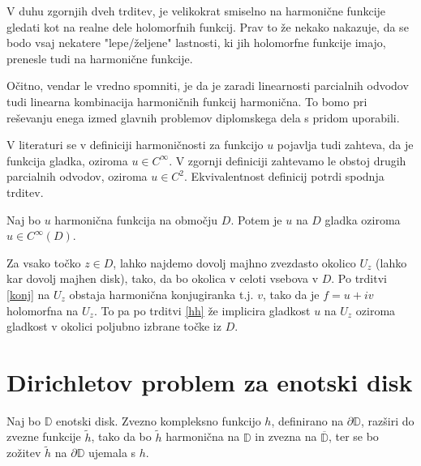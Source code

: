 \documentclass[mat1]{fmfdelo}
\begin{document}
    \begin{opomba}
        V duhu zgornjih dveh trditev, je velikokrat smiselno na harmonične funkcije gledati kot na realne dele holomorfnih funkcij. Prav to že nekako nakazuje, da se bodo vsaj nekatere "lepe/željene" lastnosti, ki jih holomorfne funkcije imajo, prenesle tudi na harmonične funkcije.
    \end{opomba}
    \begin{opomba}
        \label{lin}
        Očitno, vendar le vredno spomniti, je da je zaradi linearnosti parcialnih odvodov tudi linearna kombinacija harmoničnih funkcij harmonična. To bomo pri reševanju enega izmed glavnih problemov diplomskega dela s pridom uporabili.
    \end{opomba}
    \begin{opomba}
        V literaturi se v definiciji harmoničnosti za funkcijo $u$ pojavlja tudi zahteva, da je funkcija gladka, oziroma $u \in C^{\infty}$. V zgornji definiciji zahtevamo le obstoj drugih parcialnih odvodov, oziroma $u \in C^2$. 
        Ekvivalentnost definicij potrdi spodnja trditev.
    \end{opomba}
    \begin{trditev}
        \label{gladkosth}
        Naj bo $u$ harmonična funkcija na območju $D$. Potem je $u$ na $D$ gladka oziroma $u \in C^{\infty}(D)$. 
    \end{trditev}
    \begin{dokaz}
        Za vsako točko $z \in D$, lahko najdemo dovolj majhno zvezdasto okolico $U_z$ (lahko kar dovolj majhen disk), tako, da bo okolica v celoti vsebova v $D$. 
        Po trditvi \ref{konj} na $U_z$ obstaja harmonična konjugiranka t.j. $v$, tako da je $f = u+ iv$ holomorfna na $U_z$. To pa po trditvi \ref{hh} že implicira gladkost $u$ na $U_z$ oziroma gladkost v okolici poljubno izbrane točke iz $D$. 
    \end{dokaz}

\newpage
\section{Dirichletov problem za enotski disk}
    \begin{pro}
        Naj bo $\mathbb{D}$ enotski disk. Zvezno kompleksno funkcijo $h$, definirano na $\partial \mathbb{D}$, razširi do zvezne funkcije $\widetilde{h}$, tako da bo $\widetilde{h}$ harmonična na $\mathbb{D}$ in zvezna na $\overline{\mathbb{D}}$, ter se bo zožitev $\widetilde{h}$ na $\partial \mathbb{D}$ ujemala s $h$.
    \end{pro}
\end{document}
